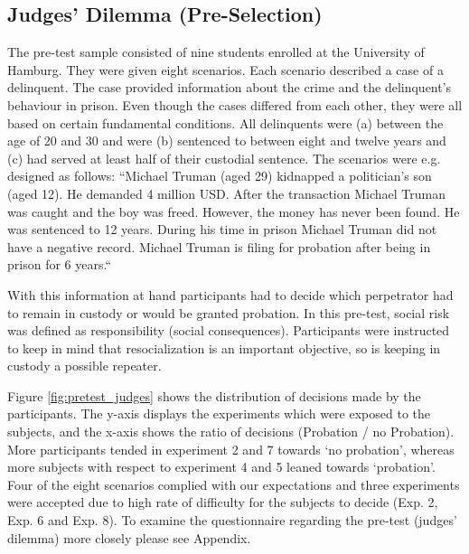 \FloatBarrier
\subsection{Judges’ Dilemma (Pre-Selection)}\label{sec:judges_dilemma_pre_selection}
The pre-test sample consisted of nine students enrolled at the University of Hamburg. They were given eight scenarios. Each scenario described a case of a delinquent. The case provided information about the crime and the delinquent’s behaviour in prison. Even though the cases differed from each other, they were all based on certain fundamental conditions. All delinquents were (a) between the age of 20 and 30 and were (b) sentenced to between eight and twelve years and (c) had served at least half of their custodial sentence. The scenarios were e.g. designed as follows: “Michael Truman (aged 29) kidnapped a politician's son (aged 12). He demanded 4 million USD. After the transaction Michael Truman was caught and the boy was freed. However, the money has never been found. He was sentenced to 12 years. During his time in prison Michael Truman did not have a negative record. Michael Truman is filing for probation after being in prison for 6 years.“\par
With this information at hand participants had to decide which perpetrator had to remain in custody or would be granted probation. In this pre-test, social risk was defined as responsibility (social consequences). Participants were instructed to keep in mind that resocialization is an important objective, so is keeping in custody a possible repeater.\par
Figure \ref{fig:pretest_judges} shows the distribution of decisions made by the participants. The y-axis displays the experiments which were exposed to the subjects, and the x-axis shows the ratio of decisions (Probation / no Probation). More participants tended in experiment 2 and 7 towards ‘no probation’, whereas more subjects with respect to experiment 4 and 5 leaned towards ‘probation’. Four of the eight scenarios complied with our expectations and three experiments were accepted due to high rate of difficulty for the subjects to decide (Exp. 2, Exp. 6 and Exp. 8). To examine the questionnaire regarding the pre-test (judges’ dilemma) more closely please see Appendix.

